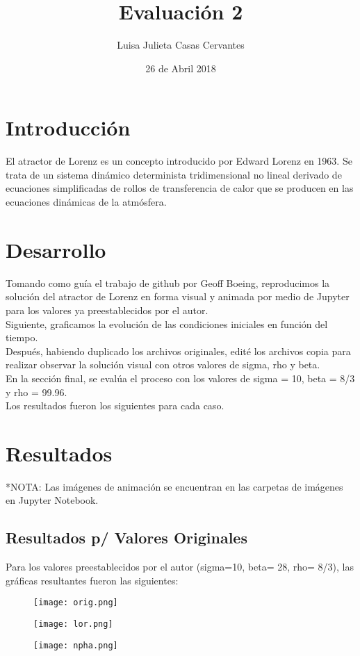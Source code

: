 \documentclass{article}
\title{Evaluación 2}
\author{Luisa Julieta Casas Cervantes}
\date{26 de Abril 2018}
\begin{document}
\maketitle
\section{Introducción}
El atractor de Lorenz es un concepto introducido por Edward Lorenz en 1963. Se trata de un sistema dinámico determinista tridimensional no lineal derivado de ecuaciones simplificadas de rollos de transferencia de calor que se producen en las ecuaciones dinámicas de la atmósfera.
\section{Desarrollo}
Tomando como guía el trabajo de github por Geoff Boeing, reproducimos la solución del atractor de Lorenz en forma visual y animada por medio de Jupyter para los valores ya preestablecidos por el autor.
\\Siguiente, graficamos la evolución de las condiciones iniciales en función del tiempo.
\\Después, habiendo duplicado los archivos originales, edité los archivos copia para realizar observar la solución visual con otros valores de sigma, rho y beta.
\\En la sección final, se evalúa el proceso con los valores de sigma = 10, beta = 8/3 y rho = 99.96.
\\Los resultados fueron los siguientes para cada caso.
\section{Resultados}
*NOTA: Las imágenes de animación se encuentran en las carpetas de imágenes en Jupyter Notebook.
\subsection{Resultados p/ Valores Originales}
Para los valores preestablecidos por el autor (sigma=10, beta= 28, rho= 8/3), las gráficas resultantes fueron las siguientes:
\begin{figure}[H]
\texttt{[image: orig.png]}
\end{figure}
\begin{figure}[H]
\texttt{[image: lor.png]}
\end{figure}
\begin{figure}[H]
\texttt{[image: npha.png]}
\end{figure}
\end{document}
